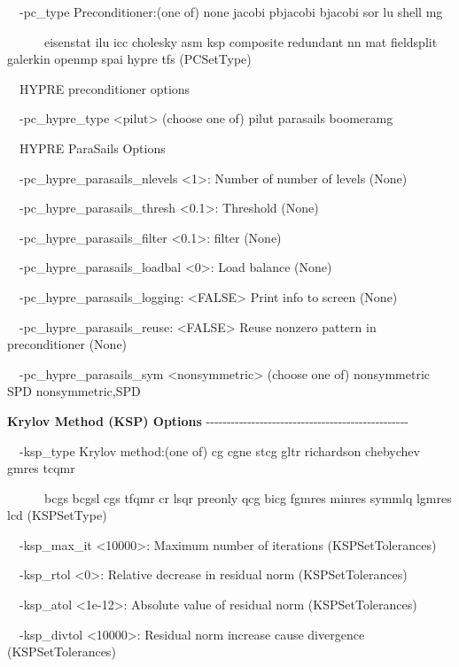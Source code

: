 \ \ {}-pc\_type Preconditioner:(one of) none jacobi pbjacobi bjacobi sor lu shell mg

\ \ \ \ \ \ eisenstat ilu icc cholesky asm ksp composite redundant nn mat fieldsplit galerkin openmp spai hypre tfs
(PCSetType)

\ \ HYPRE preconditioner options

\ \ {}-pc\_hypre\_type {\textless}pilut{\textgreater} (choose one of) pilut parasails boomeramg

\ \ HYPRE ParaSails Options

\ \ {}-pc\_hypre\_parasails\_nlevels {\textless}1{\textgreater}: Number of number of levels (None)

\ \ {}-pc\_hypre\_parasails\_thresh {\textless}0.1{\textgreater}: Threshold (None)

\ \ {}-pc\_hypre\_parasails\_filter {\textless}0.1{\textgreater}: filter (None)

\ \ {}-pc\_hypre\_parasails\_loadbal {\textless}0{\textgreater}: Load balance (None)

\ \ {}-pc\_hypre\_parasails\_logging: {\textless}FALSE{\textgreater} Print info to screen (None)

\ \ {}-pc\_hypre\_parasails\_reuse: {\textless}FALSE{\textgreater} Reuse nonzero pattern in preconditioner (None)

\ \ {}-pc\_hypre\_parasails\_sym {\textless}nonsymmetric{\textgreater} (choose one of) nonsymmetric SPD nonsymmetric,SPD

\textbf{Krylov Method (KSP) Options}
-{}-{}-{}-{}-{}-{}-{}-{}-{}-{}-{}-{}-{}-{}-{}-{}-{}-{}-{}-{}-{}-{}-{}-{}-{}-{}-{}-{}-{}-{}-{}-{}-{}-{}-{}-{}-{}-{}-{}-{}-{}-{}-{}-{}-{}-{}-{}-{}-

\ \ {}-ksp\_type Krylov method:(one of) cg cgne stcg gltr richardson chebychev gmres tcqmr

\ \ \ \ \ \ bcgs bcgsl cgs tfqmr cr lsqr preonly qcg bicg fgmres minres symmlq lgmres lcd (KSPSetType)

\ \ {}-ksp\_max\_it {\textless}10000{\textgreater}: Maximum number of iterations (KSPSetTolerances)

\ \ {}-ksp\_rtol {\textless}0{\textgreater}: Relative decrease in residual norm (KSPSetTolerances)

\ \ {}-ksp\_atol {\textless}1e-12{\textgreater}: Absolute value of residual norm (KSPSetTolerances)

\ \ {}-ksp\_divtol {\textless}10000{\textgreater}: Residual norm increase cause divergence (KSPSetTolerances)

